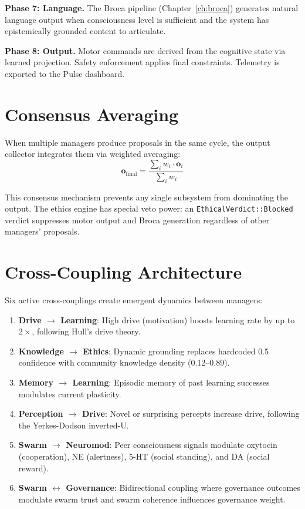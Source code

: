 \documentclass[12pt]{book}
\begin{document}
\textbf{Phase 7: Language.} The Broca pipeline (Chapter~\ref{ch:broca}) generates natural language output when consciousness level is sufficient and the system has epistemically grounded content to articulate.

\textbf{Phase 8: Output.} Motor commands are derived from the cognitive state via learned projection. Safety enforcement applies final constraints. Telemetry is exported to the Pulse dashboard.

\section{Consensus Averaging}

When multiple managers produce proposals in the same cycle, the output collector integrates them via weighted averaging:
\begin{equation}\label{eq:consensus}
\mathbf{o}_{\text{final}} = \frac{\sum_i w_i \cdot \mathbf{o}_i}{\sum_i w_i}
\end{equation}

This consensus mechanism prevents any single subsystem from dominating the output. The ethics engine has special veto power: an \texttt{EthicalVerdict::Blocked} verdict suppresses motor output and Broca generation regardless of other managers' proposals.

\section{Cross-Coupling Architecture}

Six active cross-couplings create emergent dynamics between managers:

\begin{enumerate}
  \item \textbf{Drive $\to$ Learning}: High drive (motivation) boosts learning rate by up to $2\times$, following Hull's drive theory.
  \item \textbf{Knowledge $\to$ Ethics}: Dynamic grounding replaces hardcoded 0.5 confidence with community knowledge density (0.12--0.89).
  \item \textbf{Memory $\to$ Learning}: Episodic memory of past learning successes modulates current plasticity.
  \item \textbf{Perception $\to$ Drive}: Novel or surprising percepts increase drive, following the Yerkes-Dodson inverted-U.
  \item \textbf{Swarm $\to$ Neuromod}: Peer consciousness signals modulate oxytocin (cooperation), NE (alertness), 5-HT (social standing), and DA (social reward).
  \item \textbf{Swarm $\leftrightarrow$ Governance}: Bidirectional coupling where governance outcomes modulate swarm trust and swarm coherence influences governance weight.
\end{enumerate}
\end{document}
